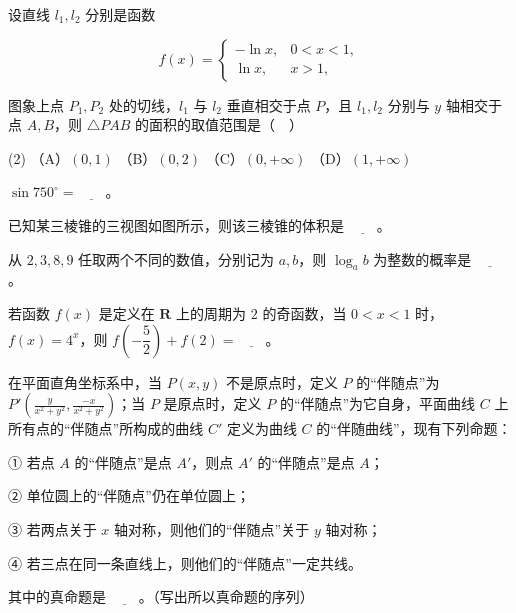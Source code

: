 \begin{question}
设直线 \(l_{1},l_{2}\) 分别是函数

\nopagebreak[4]
\[
f(x)=\begin{cases}
-\ln x, & 0<x<1,\\
\ln x, & x>1,
\end{cases}
\]

图象上点 \(P_{1},P_{2}\) 处的切线，\(l_{1}\) 与 \(l_{2}\) 垂直相交于点 \(P\)，且 \(l_{1},l_{2}\) 分别与 \(y\) 轴相交于点 \(A,B\)，则 \(\triangle PAB\) 的面积的取值范围是（　）

\begin{gkopts}(2)
\task （A）\((0,1)\)
\task （B）\((0,2)\)
\task （C）\((0,+\infty)\)
\task （D）\((1,+\infty)\)
\end{gkopts}

\end{question}

\begin{question}
\(\sin 750^{\circ}=\underline{\qquad}\)。

\Needspace{0.4\textheight}
\end{question}
\begin{question}
已知某三棱锥的三视图如图所示，则该三棱锥的体积是 \(\underline{\qquad}\)。
\nopagebreak[4]
\begin{center}\end{center}
\nopagebreak[4]
\end{question}
\begin{question}
从 \(2,3,8,9\) 任取两个不同的数值，分别记为 \(a,b\)，则 \(\log_{a}b\) 为整数的概率是 \(\underline{\qquad}\)。

\end{question}
\begin{question}
若函数 \(f(x)\) 是定义在 \(\mathbf{R}\) 上的周期为 \(2\) 的奇函数，当 \(0<x<1\) 时，\(f(x)=4^{x}\)，则 \(f\left(-\dfrac{5}{2}\right)+f(2)=\underline{\qquad}\)。

\end{question}
\begin{question}
在平面直角坐标系中，当 \(P(x,y)\) 不是原点时，定义 \(P\) 的“伴随点”为 \(P'\left(\frac{y}{x^{2}+y^{2}},\frac{-x}{x^{2}+y^{2}}\right)\)；当 \(P\) 是原点时，定义 \(P\) 的“伴随点”为它自身，平面曲线 \(C\) 上所有点的“伴随点”所构成的曲线 \(C'\) 定义为曲线 \(C\) 的“伴随曲线”，现有下列命题：

① 若点 \(A\) 的“伴随点”是点 \(A'\)，则点 \(A'\) 的“伴随点”是点 \(A\)；

② 单位圆上的“伴随点”仍在单位圆上；

③ 若两点关于 \(x\) 轴对称，则他们的“伴随点”关于 \(y\) 轴对称；

④ 若三点在同一条直线上，则他们的“伴随点”一定共线。

其中的真命题是 \(\underline{\qquad}\)。（写出所以真命题的序列）

\end{question}

